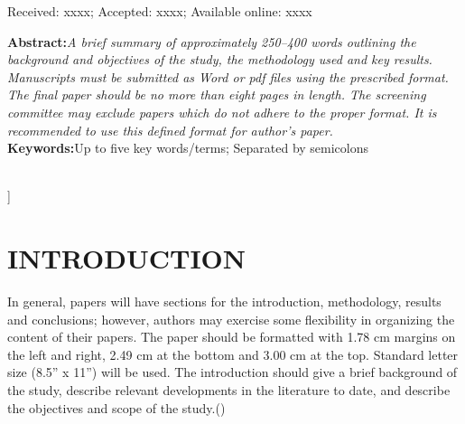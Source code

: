\documentclass[10pt,letterpaper,twocolumn]{article}
\begin{document}
\begin{@twocolumnfalse}
	\begin{center}
		Received: xxxx; Accepted: xxxx; Available online: xxxx
	\end{center}


\noindent
\textbf{Abstract:}\textit{\small A brief summary of approximately 250–400 words outlining the background and objectives of the study, the methodology used and key results. Manuscripts must be submitted as Word or pdf files using the prescribed format. The final paper should be no more than eight pages in length. The screening committee may exclude papers which do not adhere to the proper format. It is recommended to use this defined format for author’s paper.}\\

\noindent
\textbf{Keywords:}\small Up to five key words/terms; Separated by semicolons
\\
\\

\end{@twocolumnfalse}
]


\section{INTRODUCTION}
		In general, papers will have sections for the introduction, methodology, results and conclusions; however, authors may exercise some flexibility in organizing the content of their papers. 
		The paper should be formatted with 1.78 cm margins on the left and right, 2.49 cm at the bottom and 3.00 cm at the top. Standard letter size (8.5” x 11”) will be used. The introduction should give a brief background of the study, describe relevant developments in the literature to date, and describe the objectives and scope of the study.(\cite{kim2018introduction})









\end{document}
